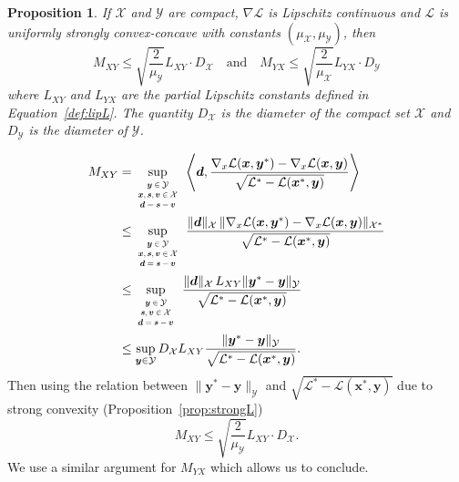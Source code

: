 \documentclass[twoside]{article}
\renewcommand{\L}{\mathcal{L}}
\newcommand{\X}{\mathcal{X}}
\newcommand{\Y}{\mathcal{Y}}
\newcommand{\prodscal}[2]{\left\langle#1,#2\right\rangle}
\newcommand{\x}{\bm{x}}
\newcommand{\y}{\bm{y}}
\newcommand{\s}{\bm{s}}
\newtheorem{proposition}[definition]{Proposition}
\newcommand{\dd}{\bm{d}}
\newcommand{\vv}{\bm{v}} %
\newcommand{\0}{\mathbf{0}} %
\begin{document}
  \begin{proposition}\label{Mbounded}
  If  $\X$ and $\Y$ are compact, $\nabla \L$ is Lipschitz continuous and $\L$ is uniformly strongly convex-concave with constants $(\mu_\X, \mu_\Y)$, then
    \begin{equation}
      M_{XY} \leq \sqrt{\frac{2}{\mu_\Y}}L_{XY} \cdot D_\X 
      \quad \text{and} \quad
      M_{YX} \leq \sqrt{\frac{2}{\mu_\X}}L_{YX} \cdot D_\Y
    \end{equation}
  where $L_{XY}$ and $L_{YX}$ are the \emph{partial} Lipschitz constants defined in Equation~\eqref{def:lipL}. The quantity $D_\X$ is the diameter of the compact set $\X$
  and $D_\Y$ is the diameter of $\Y$.
  \end{proposition}
  \proof
   \begin{align*}
   M_{XY}
   &= \sup_{\substack{\scalebox{0.65}{
          $ \begin{matrix}
                    \y \in \Y \\
                    \x, \s,\vv \in \X \\
                    \dd = \s -\vv 
                  \end{matrix}$
     }}} \;\prodscal{\dd}{\frac{\nabla_x\L(\x,\y^*)-\nabla_x\L(\x,\y)}{\sqrt{\L^*-\L(\x^*,\y)}}} \\        
    &\leq \sup_{\substack{\scalebox{0.65}{
              $ \begin{matrix}
                        \y \in \Y \\
                        \x, \s,\vv \in \X \\
                        \dd = \s -\vv 
                      \end{matrix}$
         }}} \; {\frac{ \|\dd\|_\X \, \|\nabla_x\L(\x,\y^*)-\nabla_x\L(\x,\y) \|_{\X^*}}{\sqrt{\L^*-\L(\x^*,\y)}}} \\
    & \leq \sup_{\substack{\scalebox{0.65}{
              $ \begin{matrix}
                        \y \in \Y \\
                        \s,\vv \in \X \\
                        \dd = \s -\vv 
                      \end{matrix}$
         }}} \; {\frac{ \|\dd\|_\X \,  L_{XY} \|\y^*-\y \|_\Y}{\sqrt{\L^*-\L(\x^*,\y)}}} \\
     & \leq  \sup_{\y \in \Y} D_\X L_{XY} \frac{\|\y^*-\y\|_\Y}{\sqrt{\L^*-\L(\x^*,\y)}}.
  \end{align*}
  Then using the relation between $\|\y^*-\y\|_\Y$ and $\sqrt{\L^*-\L(\x^*,\y)}$ due to strong convexity (Proposition~\ref{prop:strongL})
  \begin{equation}
  M_{XY} \leq \sqrt{\frac{2}{\mu_\Y}}L_{XY}\cdot D_\X.
  \end{equation}
  We use a similar argument for $M_{YX}$ which allows us to conclude.
  \endproof
\end{document}
